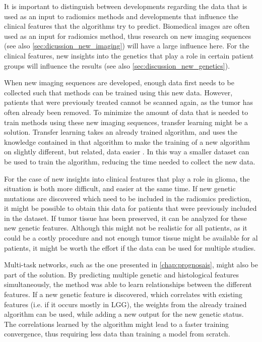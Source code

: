 It is important to distinguish between developments regarding the data that is used as an input to radiomics methods and developments that influence the clinical features that the algorithms try to predict.
Biomedical images are often used as an input for radiomics method, thus research on new imaging sequences (see also \cref{sec:dicussion_new_imaging}) will have a large influence here.
For the clinical features, new insights into the genetics that play a role in certain patient groups will influence the results (see also \cref{sec:discussion_new_genetics}).

When new imaging sequences are developed, enough data first needs to be collected such that methods can be trained using this new data.
However, patients that were previously treated cannot be scanned again, as the \gls{tumor} has often already been removed.
To minimize the amount of data that is needed to train methods using these new imaging sequences, transfer learning might be a solution.
Transfer learning takes an already trained algorithm, and uses the knowledge contained in that algorithm to make the training of a new algorithm on slightly different, but related, data easier \autocite{shin2016transfer}.
In this way a smaller dataset can be used to train the algorithm, reducing the time needed to collect the new data.

For the case of new insights into clinical features that play a role in glioma, the situation is both more difficult, and easier at the same time.
If new genetic mutations are discovered which need to be included in the radiomics prediction, it might be possible to obtain this data for patients that were previously included in the dataset.
If tumor tissue has been preserved, it can be analyzed for these new genetic features.
Although this might not be realistic for all patients, as it could be a costly procedure and not enough \gls{tumor} tissue might be available for al patients, it might be worth the effort if the data can be used for multiple studies.

Multi-task networks, such as the one presented in \cref{chap:prognosais}, might also be part of the solution.
By predicting multiple genetic and histological features simultaneously, the method was able to learn relationships between the different features.
If a new genetic feature is discovered, which correlates with existing features (i.e. if it occurs mostly in \gls{LGG}), the weights from the already trained algorithm can be used, while adding a new output for the new genetic status.
The correlations learned by the algorithm might lead to a faster training convergence, thus requiring less data than training a model from scratch.





